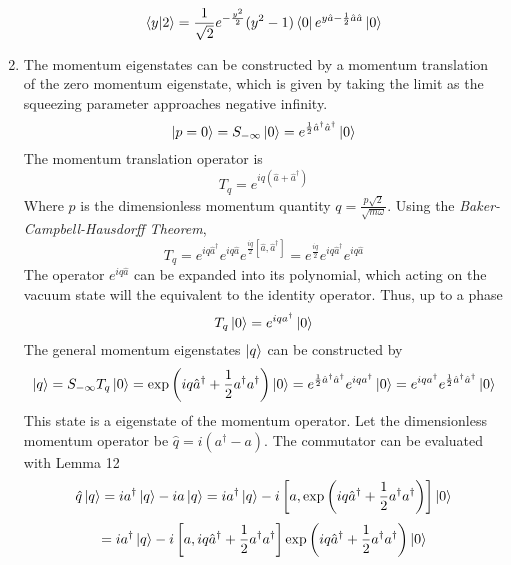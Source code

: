 \begin{sol}
\begin{enumerate}[label=\textbf{(\alph*)}]
\begin{equation}
	\braket{y}{2}=\frac{1}{\sqrt 2}e^{-\frac{y^2}{2}}(y^2-1)\bra 0e^{y\hat a-\frac{1}{2}\hat a\hat a}\ket 0
\end{equation}
    \item
    The momentum eigenstates can be constructed by a momentum translation of the zero momentum eigenstate, which is given by taking the limit as the squeezing parameter approaches negative infinity. 
    \begin{equation}
	\ket{p=0}=S_{-\infty}\ket 0=e^{\frac{1}{2}\hat a^\dagger\hat a^\dagger}\ket 0
\end{equation}
    The momentum translation operator is
    \begin{equation}
	T_q = e^{iq(\hat a+\hat a^\dagger)}
\end{equation}
    Where $p$ is the dimensionless momentum quantity $q=\frac{p\sqrt{2}}{\sqrt{m\omega}}$. Using the \textit{Baker-Campbell-Hausdorff Theorem}, 
    \begin{equation}
	T_q = e^{iq\hat a^\dagger}e^{iq\hat a}e^{\frac{iq}{2}[\hat a,\hat a^\dagger]}=e^{\frac{iq}{2}}e^{iq\hat a^\dagger}e^{iq\hat a}
\end{equation}
    The operator $e^{iq\hat a}$ can be expanded into its polynomial, which acting on the vacuum state will the equivalent to the identity operator. Thus, up to a phase
    \begin{equation}
	T_q\ket 0 = e^{iqa^\dagger}\ket 0
\end{equation}
    The general momentum eigenstates $\ket q$ can be constructed by
    \begin{equation}
	\ket q = S_{-\infty}T_q\ket 0=\exp\left(iq\hat a^\dagger+\frac{1}{2}a^\dagger a^\dagger\right)\ket0=e^{\frac{1}{2}\hat a^\dagger\hat a^\dagger}e^{iqa^\dagger}\ket 0=e^{iqa^\dagger}e^{\frac{1}{2}\hat a^\dagger\hat a^\dagger}\ket{0}
\end{equation}
    This state is a eigenstate of the momentum operator. Let the dimensionless momentum operator be $\hat q = i(a^\dagger-a)$. The commutator can be evaluated with Lemma 12
    \begin{equation}
	\hat q\ket q=ia^\dagger \ket q-ia\ket q=ia^\dagger \ket q-i\left[a, \exp\left(iq\hat a^\dagger+\frac{1}{2}a^\dagger a^\dagger\right)\right]\ket 0
\end{equation}
    \begin{equation}
	=ia^\dagger \ket q-i\left[a, iq\hat a^\dagger+\frac{1}{2}a^\dagger a^\dagger\right]\exp\left(iq\hat a^\dagger+\frac{1}{2}a^\dagger a^\dagger\right)\ket 0
\end{equation}

\end{enumerate}
\end{sol}

